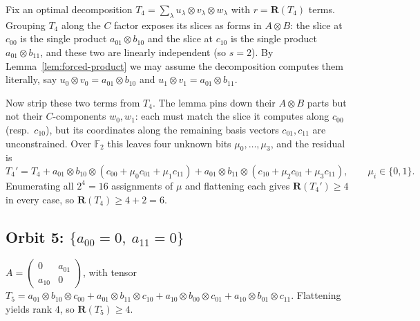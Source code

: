 \documentclass[11pt]{article}
\theoremstyle{definition}
\newcommand{\F}{\mathbb{F}}
\newcommand{\R}{\mathbf{R}}
\begin{document}
Fix an optimal decomposition $T_4=\sum_{\lambda} u_\lambda\otimes v_\lambda\otimes
w_\lambda$ with $r=\R(T_4)$ terms. Grouping $T_4$ along the $C$ factor exposes its
slices as forms in $A\otimes B$: the slice at $c_{00}$ is the single product
$a_{01}\otimes b_{10}$ and the slice at $c_{10}$ is the single product
$a_{01}\otimes b_{11}$, and these two are linearly independent (so $s=2$). By
Lemma~\ref{lem:forced-product} we may assume the decomposition computes them
literally, say $u_0\otimes v_0=a_{01}\otimes b_{10}$ and
$u_1\otimes v_1=a_{01}\otimes b_{11}$.

Now strip these two terms from $T_4$. The lemma pins down their $A\otimes B$ parts
but not their $C$-components $w_0,w_1$: each must match the slice it computes along
$c_{00}$ (resp.\ $c_{10}$), but its coordinates along the remaining basis vectors
$c_{01},c_{11}$ are unconstrained. Over $\F_2$ this leaves four unknown bits
$\mu_0,\dots,\mu_3$, and the residual is
\[
  T_4'=T_4+a_{01}\otimes b_{10}\otimes(c_{00}+\mu_0 c_{01}+\mu_1 c_{11})
  +a_{01}\otimes b_{11}\otimes(c_{10}+\mu_2 c_{01}+\mu_3 c_{11}),
  \qquad \mu_i\in\{0,1\}.
\]
Enumerating all $2^4=16$ assignments of $\mu$ and flattening each gives $\R(T_4')\ge 4$ in
every case, so $\R(T_4)\ge 4+2=6$.

\subsection*{Orbit 5: $\{a_{00}=0,\ a_{11}=0\}$}
$A=
\begin{pmatrix}0 & a_{01} \\a_{10}&0
\end{pmatrix}$, with tensor
$T_5=a_{01}\otimes b_{10}\otimes c_{00}+a_{01}\otimes b_{11}\otimes c_{10}
+a_{10}\otimes b_{00}\otimes c_{01}+a_{10}\otimes b_{01}\otimes c_{11}$.
Flattening yields rank $4$, so $\R(T_5)\ge 4$.
\end{document}
